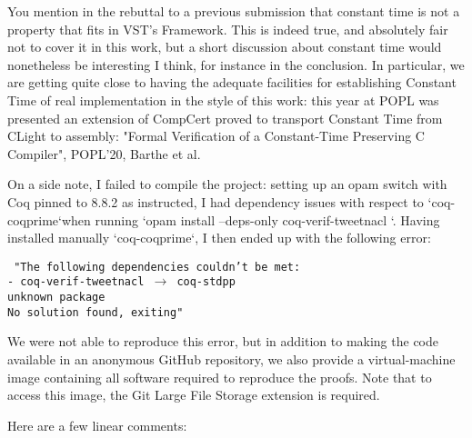 You mention in the rebuttal to a previous submission that constant time is not a property that fits in VST's Framework. This is indeed true, and absolutely fair not to cover it in this work, but a short discussion about constant time would nonetheless be interesting I think, for instance in the conclusion. In particular, we are getting quite close to having the adequate facilities for establishing Constant Time of real implementation in the style of this work: this year at POPL was presented an extension of CompCert proved to transport Constant Time from CLight to assembly:
"Formal Verification of a Constant-Time Preserving C Compiler", POPL'20, Barthe et al.

On a side note, I failed to compile the project: setting up an opam switch with Coq pinned to 8.8.2 as instructed, I had dependency issues with respect to `coq-coqprime`when running `opam install --deps-only coq-verif-tweetnacl `. Having installed manually `coq-coqprime`, I then ended up with the following error:

{\footnotesize\texttt{
  "The following dependencies couldn't be met:\\
  - coq-verif-tweetnacl $\rightarrow$ coq-stdpp \\
  unknown package\\
  No solution found, exiting"}}
\begin{answer}
  We were not able to reproduce this error, but
  in addition to making the code available in an anonymous GitHub repository,
  we also provide a virtual-machine image containing all software required to reproduce the proofs.
  Note that to access this image, the Git Large File Storage extension is required.
\end{answer}

Here are a few linear comments:

